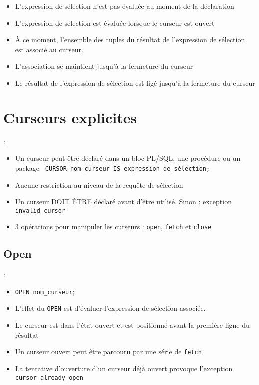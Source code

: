\documentclass[10pt]{beamer}
\begin{document}
\begin{frame}{\secname}
    \begin{itemize}
        \item L'expression de sélection n'est pas évaluée au moment de la déclaration
        \item L'expression de sélection est évaluée lorsque le curseur est ouvert
        \item À ce moment, l'ensemble des tuples du résultat de l'expression de sélection est associé au curseur.
        \item L'association se maintient jusqu'à la fermeture du curseur
        \item Le résultat de l'expression de sélection est figé jusqu'à la fermeture du curseur
    \end{itemize}
\end{frame}


\section{Curseurs explicites}
\begin{frame}{\secname : \subsecname}
    \begin{itemize}
        \item Un curseur peut être déclaré dans un bloc PL/SQL, une procédure ou un package
              \lstinline[language=plsql]! CURSOR nom_curseur IS expression_de_sélection;!
        \item Aucune restriction au niveau de la requête de sélection
        \item Un curseur DOIT ÊTRE déclaré avant d'être utilisé.  Sinon : exception \lstinline[language=plsql]!invalid_cursor!
        \item 3 opérations pour manipuler les curseurs : \lstinline[language=plsql]!open!, \lstinline[language=plsql]!fetch! et \lstinline[language=plsql]!close!
    \end{itemize}
\end{frame}

\subsection{Open}
\begin{frame}{\secname : \subsecname}
    \begin{itemize}
        \item \lstinline[language=plsql]!OPEN nom_curseur!;
        \item L'effet du \lstinline[language=plsql]!OPEN! est d'évaluer l'expression de sélection associée.
        \item Le curseur est dans l'état ouvert et est positionné avant la première ligne du résultat
        \item Un curseur ouvert peut être parcouru par une série de \lstinline[language=plsql]!fetch!
        \item La tentative d'ouverture d'un curseur déjà ouvert provoque l'exception \lstinline[language=plsql]!cursor_already_open!
    \end{itemize}
\end{frame}
\end{document}
